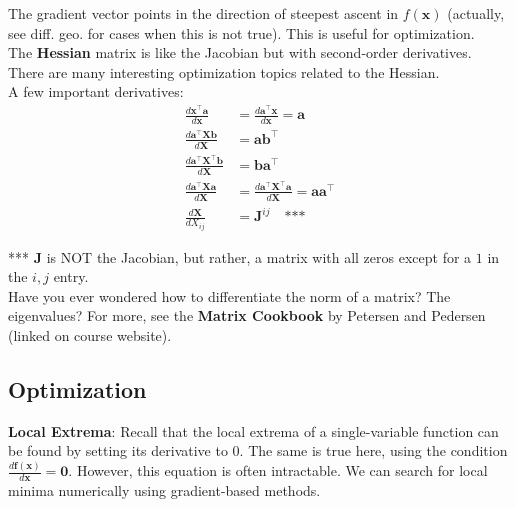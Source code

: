 \documentclass{harvardml}
\theoremstyle{definition}
\theoremstyle{plain}
\renewcommand{\v}[1]{\mathbf{#1}}
\begin{document}
            \noindent The gradient vector points in the direction of 
			steepest ascent in $f(\mathbf{x})$ (actually, see diff. geo. for cases
			when this is not true). This is useful for 
			optimization.\\

            \noindent The \textbf{Hessian} matrix is like the Jacobian but with
            second-order derivatives. There are many interesting optimization
            topics related to the Hessian.\\

            \noindent A few important derivatives:
            \begin{align*}
                \frac{d \v x^\top \v a}{d \v x}
                    &= \frac{d \v a^\top \v x }{d \v x} = \v a\\
                \frac{d \v a^\top \v X \v b}{d \v X} &= \v a \v b^\top\\
                \frac{d \v a^\top \v X^\top \v b}{d \v X} &= \v b \v a^\top\\
                \frac{d \v a^\top \v X \v a}{d \v X} &=
                        \frac{d \v a^\top \v X^\top \v a}{d \v X} = 
                        \v a \v a^\top\\
                \frac{d \v X}{d X_{ij}} &= \v J^{ij} \quad \text{***}
            \end{align*}                
                
             *** $\v J$ is NOT the Jacobian, but rather, a matrix with
             all zeros except for a $1$ in the $i,j$ entry.\\
    
            \noindent Have you ever wondered how to differentiate
            the norm of a matrix? The eigenvalues? 
            For more, see the \textbf{Matrix Cookbook} 
            by Petersen and Pedersen (linked on course website).\\


    \subsection{Optimization}
            \textbf{Local Extrema}: Recall that the local extrema of a 
			single-variable function can be found by setting its derivative 
			to 0. The same is true here, using the condition 
			$\frac{d \mathbf{f}(\mathbf{x})}{d \mathbf{x}}= \mathbf{0}$. 
			However, this equation is often intractable. We can search for 
            local minima numerically using gradient-based methods.\\
\end{document}
